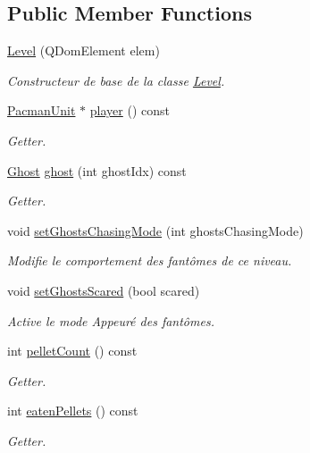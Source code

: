 \subsection*{Public Member Functions}
\begin{DoxyCompactItemize}
\item 
\hyperlink{class_level_a610ec153d154322c3d42af030bf54425}{Level} (Q\+Dom\+Element elem)
\begin{DoxyCompactList}\small\item\em Constructeur de base de la classe \hyperlink{class_level}{Level}. \end{DoxyCompactList}\item 
\hyperlink{class_pacman_unit}{Pacman\+Unit} $\ast$ \hyperlink{class_level_afdd877e4e92747abb3718060e77b9cd6}{player} () const 
\begin{DoxyCompactList}\small\item\em Getter. \end{DoxyCompactList}\item 
\hyperlink{class_ghost}{Ghost} \hyperlink{class_level_afe5a9cb5dc0a1f56b5e491298abfc5c5}{ghost} (int ghost\+Idx) const 
\begin{DoxyCompactList}\small\item\em Getter. \end{DoxyCompactList}\item 
void \hyperlink{class_level_a90eaf5382cf0c6a31c0db006644b798c}{set\+Ghosts\+Chasing\+Mode} (int ghosts\+Chasing\+Mode)
\begin{DoxyCompactList}\small\item\em Modifie le comportement des fantômes de ce niveau. \end{DoxyCompactList}\item 
void \hyperlink{class_level_a4ba3695094e42f46ed7af0f489e36b15}{set\+Ghosts\+Scared} (bool scared)
\begin{DoxyCompactList}\small\item\em Active le mode Appeuré des fantômes. \end{DoxyCompactList}\item 
int \hyperlink{class_level_a05f5d955db2a800d9073d5cd9159d6f7}{pellet\+Count} () const 
\begin{DoxyCompactList}\small\item\em Getter. \end{DoxyCompactList}\item 
int \hyperlink{class_level_a22e230e7ff4e40ae092534caafda9060}{eaten\+Pellets} () const 
\begin{DoxyCompactList}\small\item\em Getter. \end{DoxyCompactList}\item 

\end{DoxyCompactItemize}
